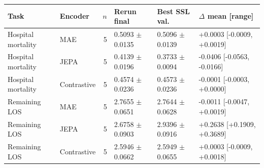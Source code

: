 \begin{tabular}{llrlll}
\toprule
Task & Encoder & $n$ & Rerun final & Best SSL val. & $\Delta$ mean [range] \\
\midrule
Hospital mortality & MAE & 5 & 0.5093 $\pm$ 0.0135 & 0.5096 $\pm$ 0.0139 & +0.0003 [-0.0009, +0.0019] \\
Hospital mortality & JEPA & 5 & 0.4139 $\pm$ 0.0196 & 0.3733 $\pm$ 0.0094 & -0.0406 [-0.0563, -0.0166] \\
Hospital mortality & Contrastive & 5 & 0.4574 $\pm$ 0.0236 & 0.4573 $\pm$ 0.0236 & -0.0001 [-0.0003, +0.0000] \\
Remaining LOS & MAE & 5 & 2.7655 $\pm$ 0.0651 & 2.7644 $\pm$ 0.0628 & -0.0011 [-0.0047, +0.0019] \\
Remaining LOS & JEPA & 5 & 2.6758 $\pm$ 0.0903 & 2.9396 $\pm$ 0.0916 & +0.2638 [+0.1909, +0.3689] \\
Remaining LOS & Contrastive & 5 & 2.5946 $\pm$ 0.0662 & 2.5949 $\pm$ 0.0655 & +0.0003 [-0.0009, +0.0018] \\
\bottomrule
\end{tabular}

